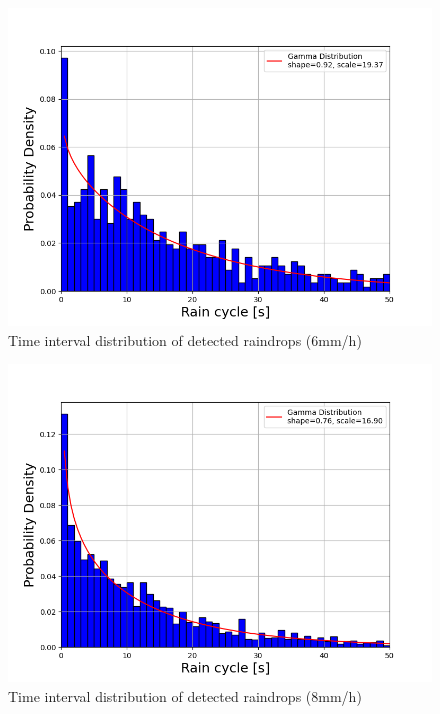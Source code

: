 \begin{figure}[H]
    \centering
    \includegraphics[keepaspectratio, scale=0.5]{images/png/6mm.png}
    \caption{Time interval distribution of detected raindrops (6mm/h)}
    \label{Fig:5.3}
\end{figure}

\begin{figure}[H]
    \centering
    \includegraphics[keepaspectratio, scale=0.5]{images/png/8mm.png}
    \caption{Time interval distribution of detected raindrops (8mm/h)}
    \label{Fig:5.4}
\end{figure}

